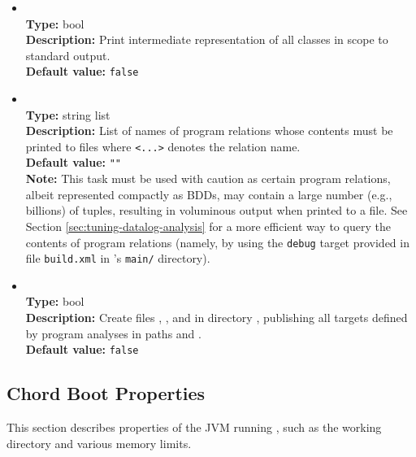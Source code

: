 \begin{itemize}
\item
{} \\
{\bf Type:} bool \\
{\bf Description:} Print intermediate representation of all classes in scope to standard output. \\
{\bf Default value:} {\tt false}

\item
{} \\
{\bf Type:} string list \\
{\bf Description:} List of names of program relations whose contents must be printed to files  where {\tt <...>} denotes the relation name. \\
{\bf Default value:} {\tt ""} \\
{\bf Note:} This task must be used with caution as certain program relations, albeit represented compactly as BDDs, may contain a large number (e.g., billions) of tuples, resulting in voluminous output when printed to a file.  See Section \ref{sec:tuning-datalog-analysis} for a more efficient way to query the contents of program relations (namely, by using the {\tt debug} target provided in file {\tt build.xml} in \Chord's {\tt main/} directory).

\item
{} \\
{\bf Type:} bool \\
{\bf Description:} Create files , , and  in directory , publishing all targets defined by program analyses in paths  and . \\
{\bf Default value:} {\tt false}
\end{itemize}

\subsection{Chord Boot Properties}

This section describes properties of the JVM running \Chord, such as the working directory and various memory limits.
 
